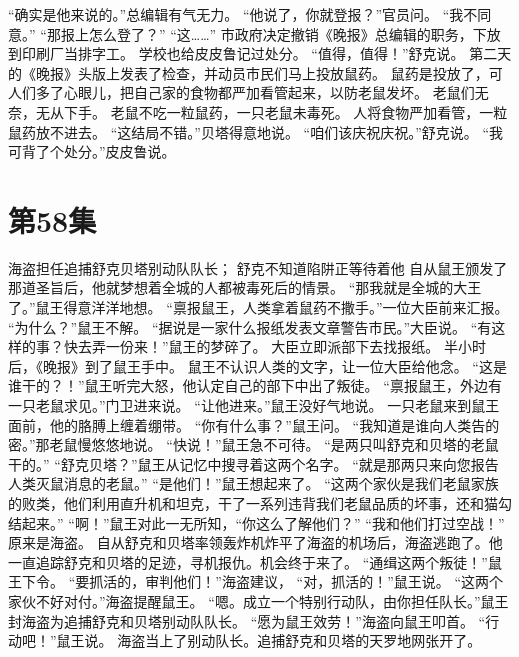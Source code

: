 \documentclass[a4paper,12pt,UTF8,twoside]{ctexbook}
\begin{document}
        “确实是他来说的。”总编辑有气无力。 
        “他说了，你就登报？”官员问。 
        “我不同意。” 
        “那报上怎么登了？” 
        “这……” 
        市政府决定撤销《晚报》总编辑的职务，下放到印刷厂当排字工。 
        学校也给皮皮鲁记过处分。 
        “值得，值得！”舒克说。 
        第二天的《晚报》头版上发表了检查，并动员市民们马上投放鼠药。 
        鼠药是投放了，可人们多了心眼儿，把自己家的食物都严加看管起来，以防老鼠发坏。 
        老鼠们无奈，无从下手。 
        老鼠不吃一粒鼠药，一只老鼠未毒死。 
        人将食物严加看管，一粒鼠药放不进去。 
        “这结局不错。”贝塔得意地说。 
        “咱们该庆祝庆祝。”舒克说。 
        “我可背了个处分。”皮皮鲁说。   \chapter{第58集} 
        海盗担任追捕舒克贝塔别动队队长； 
        舒克不知道陷阱正等待着他   
        自从鼠王颁发了那道圣旨后，他就梦想着全城的人都被毒死后的情景。 
        “那我就是全城的大王了。”鼠王得意洋洋地想。 
        “禀报鼠王，人类拿着鼠药不撒手。”一位大臣前来汇报。 
        “为什么？”鼠王不解。 
        “据说是一家什么报纸发表文章警告市民。”大臣说。 
        “有这样的事？快去弄一份来！”鼠王的梦碎了。 
        大臣立即派部下去找报纸。 
        半小时后，《晚报》到了鼠王手中。 
        鼠王不认识人类的文字，让一位大臣给他念。 
        “这是谁干的？！”鼠王听完大怒，他认定自己的部下中出了叛徒。 
        “禀报鼠王，外边有一只老鼠求见。”门卫进来说。 
        “让他进来。”鼠王没好气地说。 
        一只老鼠来到鼠王面前，他的胳膊上缠着绷带。 
        “你有什么事？”鼠王问。 
        “我知道是谁向人类告的密。”那老鼠慢悠悠地说。 
        “快说！”鼠王急不可待。 
        “是两只叫舒克和贝塔的老鼠干的。” 
        “舒克贝塔？”鼠王从记忆中搜寻着这两个名字。 
        “就是那两只来向您报告人类灭鼠消息的老鼠。” 
        “是他们！”鼠王想起来了。 
        “这两个家伙是我们老鼠家族的败类，他们利用直升机和坦克，干了一系列违背我们老鼠品质的坏事，还和猫勾结起来。” 
        “啊！”鼠王对此一无所知，“你这么了解他们？” 
        “我和他们打过空战！” 
        原来是海盗。 
        自从舒克和贝塔率领轰炸机炸平了海盗的机场后，海盗逃跑了。他一直追踪舒克和贝塔的足迹，寻机报仇。机会终于来了。 
        “通缉这两个叛徒！”鼠王下令。 
        “要抓活的，审判他们！”海盗建议， 
        “对，抓活的！”鼠王说。 
        “这两个家伙不好对付。”海盗提醒鼠王。 
        “嗯。成立一个特别行动队，由你担任队长。”鼠王封海盗为追捕舒克和贝塔别动队队长。 
        “愿为鼠王效劳！”海盗向鼠王叩首。 
        “行动吧！”鼠王说。 
        海盗当上了别动队长。追捕舒克和贝塔的天罗地网张开了。 
\end{document}

